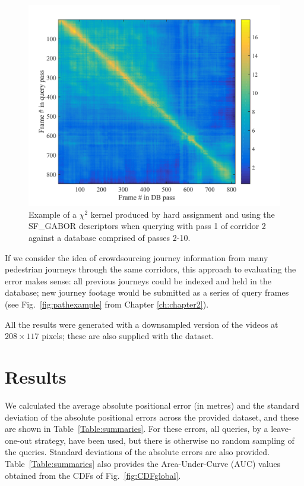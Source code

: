 \begin{figure}[h]
\centering
\includegraphics[width=\linewidth]{./gfx/Chapter04/kernel.pdf}
\caption{Example of a $\chi^2$ kernel produced by hard assignment and using the SF\_GABOR descriptors when querying with pass 1 of corridor 2 against a database comprised of passes 2-10.}
\label{fig:kernel}
\end{figure}

If we consider the idea of crowdsourcing journey information from many pedestrian journeys through the same corridors, this approach to evaluating the error makes sense:  all previous journeys could be indexed and held in the database; new journey footage would be submitted as a series of query frames (see Fig.~\ref{fig:pathexample} from Chapter \ref{ch:chapter2}).    

All the results were generated with a downsampled version of the videos at $208 \times 117$ pixels; these are also supplied with the dataset. 




\section{Results}
\label{sec:ch4results}

We calculated the average absolute positional error (in metres) and the standard deviation of the absolute positional errors across the provided dataset, and these are shown in Table~\ref{Table:summaries}. For these errors, all queries, by a leave-one-out strategy, have been used, but there is otherwise no random sampling of the queries.  Standard deviations of the absolute errors are also provided.  Table~\ref{Table:summaries} also provides the Area-Under-Curve (AUC) values obtained from the CDFs of Fig.~\ref{fig:CDFglobal}.


